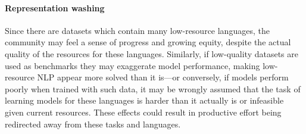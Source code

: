 \paragraph{Representation washing}
Since there are datasets which contain many low-resource languages, the community may feel a sense of progress and growing equity, despite the actual quality of the resources for these languages. %
Similarly, if low-quality datasets are used as benchmarks they may exaggerate model performance, making low-resource NLP appear more solved than it is---or conversely, if models perform poorly when trained with such data, it may be wrongly assumed that the task of learning models for these languages is harder than it actually is or infeasible given current resources. These effects could result in productive effort being redirected away from these tasks and languages.

